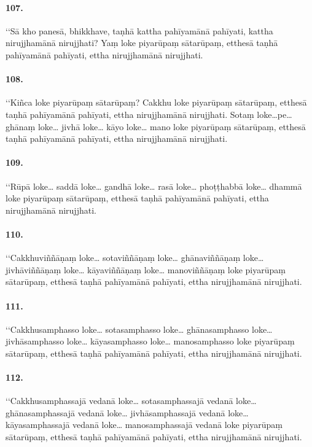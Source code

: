 \paragraph{107.} ‘‘Sā kho panesā, bhikkhave, taṇhā kattha pahīyamānā pahīyati, kattha nirujjhamānā nirujjhati? Yaṃ loke piyarūpaṃ sātarūpaṃ, etthesā taṇhā pahīyamānā pahīyati, ettha nirujjhamānā nirujjhati.

\paragraph{108.} ‘‘Kiñca loke piyarūpaṃ sātarūpaṃ? Cakkhu loke piyarūpaṃ sātarūpaṃ, etthesā taṇhā pahīyamānā pahīyati, ettha nirujjhamānā nirujjhati. Sotaṃ loke…pe… ghānaṃ loke… jivhā loke… kāyo loke… mano loke piyarūpaṃ sātarūpaṃ, etthesā taṇhā pahīyamānā pahīyati, ettha nirujjhamānā nirujjhati.

\paragraph{109.} ‘‘Rūpā loke… saddā loke… gandhā loke… rasā loke… phoṭṭhabbā loke… dhammā loke piyarūpaṃ sātarūpaṃ, etthesā taṇhā pahīyamānā pahīyati, ettha nirujjhamānā nirujjhati.

\paragraph{110.} ‘‘Cakkhuviññāṇaṃ loke… sotaviññāṇaṃ loke… ghānaviññāṇaṃ loke… jivhāviññāṇaṃ loke… kāyaviññāṇaṃ loke… manoviññāṇaṃ loke piyarūpaṃ sātarūpaṃ, etthesā taṇhā pahīyamānā pahīyati, ettha nirujjhamānā nirujjhati.

\paragraph{111.} ‘‘Cakkhusamphasso loke… sotasamphasso loke… ghānasamphasso loke… jivhāsamphasso loke… kāyasamphasso loke… manosamphasso loke piyarūpaṃ sātarūpaṃ, etthesā taṇhā pahīyamānā pahīyati, ettha nirujjhamānā nirujjhati.

\paragraph{112.} ‘‘Cakkhusamphassajā vedanā loke… sotasamphassajā vedanā loke… ghānasamphassajā vedanā loke… jivhāsamphassajā vedanā loke… kāyasamphassajā vedanā loke… manosamphassajā vedanā loke piyarūpaṃ sātarūpaṃ, etthesā taṇhā pahīyamānā pahīyati, ettha nirujjhamānā nirujjhati.

